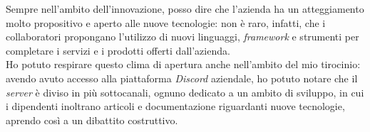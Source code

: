 Sempre nell'ambito dell'innovazione, posso dire che l'azienda ha un atteggiamento molto propositivo e aperto alle nuove tecnologie: non è raro, infatti, che i collaboratori propongano l'utilizzo di nuovi linguaggi, \textit{framework} e strumenti per completare i servizi e i prodotti offerti dall'azienda. \\
Ho potuto respirare questo clima di apertura anche nell'ambito del mio tirocinio: avendo avuto accesso alla piattaforma \textit{Discord} aziendale, ho potuto notare che il \textit{server} è diviso in più sottocanali, ognuno dedicato a un ambito di sviluppo, in cui i dipendenti inoltrano articoli e documentazione riguardanti nuove tecnologie, aprendo così a un dibattito costruttivo.
